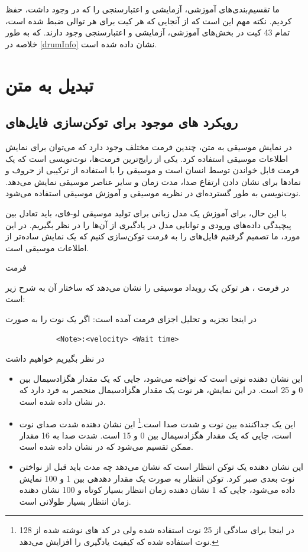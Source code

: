 ما تقسیم‌بندی‌های آموزشی، آزمایشی و اعتبارسنجی را که در  وجود داشت، حفظ
کردیم. نکته مهم این است که از آنجایی که هر کیت برای هر توالی ضبط شده
است، تمام 43 کیت در بخش‌های آموزشی، آزمایشی و اعتبارسنجی وجود دارند. که به طور خلاصه در \ref{drumInfo} نشان داده شده است.


\section{تبدیل  به متن}\label{se:tokenizer}

\subsection{رویکرد های موجود برای توکن‌سازی فایل‌های }

در نمایش موسیقی به متن، چندین فرمت مختلف وجود دارد که می‌توان برای نمایش اطلاعات
موسیقی استفاده کرد. یکی از رایج‌ترین فرمت‌ها، نوت‌نویسی  است
که یک فرمت قابل خواندن توسط انسان است و موسیقی را با استفاده از ترکیبی
از حروف و نمادها برای نشان دادن ارتفاع صدا، مدت زمان و سایر عناصر موسیقی
نمایش می‌دهد. نوت‌نویسی  به طور گسترده‌ای در نظریه موسیقی و آموزش موسیقی
استفاده می‌شود.

با این حال، برای آموزش یک مدل زبانی برای تولید موسیقی
لو-فای، باید تعادل بین پیچیدگی داده‌های ورودی و توانایی مدل در
یادگیری از آن‌ها را در نظر بگیریم. در این مورد، ما تصمیم گرفتیم فایل‌های
 را به فرمت  توکن‌سازی کنیم که یک نمایش ساده‌تر از
اطلاعات موسیقی است.

فرمت 

در فرمت ، هر توکن یک رویداد موسیقی را نشان می‌دهد که
ساختار آن به شرح زیر است:

در اینجا تجزیه و تحلیل اجزای فرمت آمده است:
اگر یک نوت را به صورت
\begin{LTR}
      \begin{verbatim}
            <Note>:<velocity> <Wait time>
      \end{verbatim}
\end{LTR}
در نظر بگیریم خواهیم داشت

\begin{itemize}
      \item[\lr{<Note>}]
            این نشان دهنده نوتی است که نواخته می‌شود، جایی که  یک مقدار هگزادسیمال بین 0 و 25 است. در این نمایش، هر نوت یک مقدار هگزادسیمال منحصر به فرد دارد که در  نشان داده شده است.
      \item[\lr{<velocity>}]  این یک جداکننده بین نوت و شدت صدا است.\footnote{در اینجا برای سادگی از 25 نوت استفاده شده ولی در کد های نوشته شده از 128 نوت استفاده شده که کیفیت یادگیری را افزایش می‌دهد.}
            این نشان دهنده شدت صدای نوت است، جایی که  یک مقدار هگزادسیمال بین 0 و 15 است. شدت صدا به 16 مقدار ممکن تقسیم می‌شود که در  نشان داده شده است.
      \item[ \lr{<Wait time>}]
            این نشان دهنده یک توکن انتظار است که نشان می‌دهد چه مدت باید قبل از نواختن نوت بعدی صبر کرد. توکن انتظار به صورت یک مقدار دهدهی بین 1 و 100 نمایش داده می‌شود، جایی که 1 نشان دهنده زمان انتظار بسیار کوتاه و 100 نشان دهنده زمان انتظار بسیار طولانی است.
\end{itemize}

